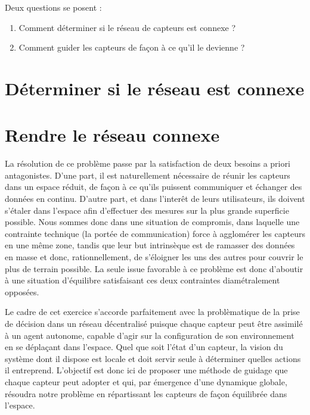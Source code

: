 \documentclass[10pt]{article}
\begin{document}
\begin{multicols}{2}
Deux questions se posent :

\begin{enumerate}
\item{Comment déterminer si le réseau de capteurs est connexe ?}
\item{Comment guider les capteurs de façon à ce qu'il le devienne ?}
\end{enumerate}

\section{Déterminer si le réseau est connexe}

\section{Rendre le réseau connexe}

La résolution de ce problème passe par la satisfaction de deux besoins
a priori antagonistes. D'une part, il est naturellement nécessaire de
réunir les capteurs dans un espace réduit, de façon à ce qu'ils
puissent communiquer et échanger des données en continu. D'autre part,
et dans l'interêt de leurs utilisateurs, ils doivent s'étaler dans
l'espace afin d'effectuer des mesures sur la plus grande superficie
possible. Nous sommes donc dans une situation de compromis, dans
laquelle une contrainte technique (la portée de communication) force à
agglomérer les capteurs en une même zone, tandis que leur but
intrinsèque est de ramasser des données en masse et donc,
rationnellement, de s'éloigner les uns des autres pour couvrir le plus
de terrain possible. La seule issue favorable à ce problème est donc
d'aboutir à une situation d'équilibre satisfaisant ces deux
contraintes diamétralement opposées.

Le cadre de cet exercice s'accorde parfaitement avec la problèmatique
de la prise de décision dans un réseau décentralisé puisque chaque
capteur peut être assimilé à un agent autonome, capable d'agir sur la
configuration de son environnement en se déplaçant dans l'espace. Quel
que soit l'état d'un capteur, la vision du système dont il dispose est
locale et doit servir seule à déterminer quelles actions il
entreprend. L'objectif est donc ici de proposer une méthode de guidage
que chaque capteur peut adopter et qui, par émergence d'une dynamique
globale, résoudra notre problème en répartissant les capteurs de façon
équilibrée dans l'espace.


\end{multicols}
\end{document}
